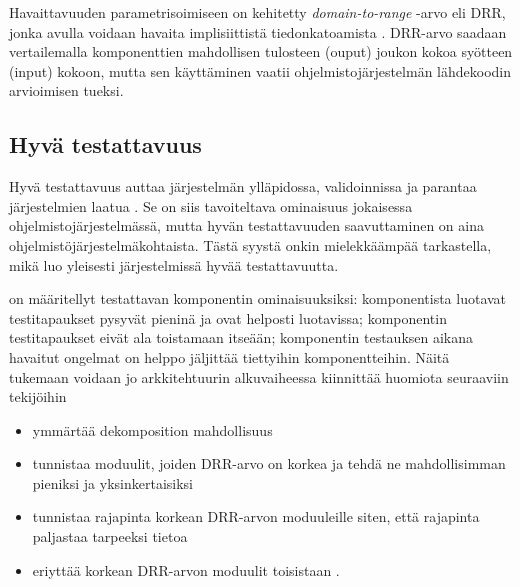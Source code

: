 \documentclass[finnish]{tktltiki2}
\theoremstyle{definition}
\theoremstyle{remark}
\begin{document}
Havaittavuuden parametrisoimiseen on kehitetty \textit{domain-to-range} -arvo eli DRR, jonka avulla voidaan havaita implisiittistä tiedonkatoamista \citep{Voas:1995:STN:624607.625469}. DRR-arvo saadaan vertailemalla komponenttien mahdollisen tulosteen (ouput) joukon kokoa syötteen (input) kokoon, mutta sen käyttäminen vaatii ohjelmistojärjestelmän lähdekoodin arvioimisen tueksi.



\subsection{Hyvä testattavuus}


Hyvä testattavuus auttaa järjestelmän ylläpidossa, validoinnissa ja parantaa järjestelmien laatua \citep[s. 20]{Voas:1995:STN:624607.625469}. Se on siis tavoiteltava ominaisuus jokaisessa ohjelmistojärjestelmässä, mutta hyvän testattavuuden saavuttaminen on aina ohjelmistöjärjestelmäkohtaista. Tästä syystä onkin mielekkäämpää tarkastella, mikä luo yleisesti järjestelmissä hyvää testattavuutta. 





\citep{Freedman:1991:TSC:126218.126229} on määritellyt testattavan komponentin ominaisuuksiksi: komponentista luotavat testitapaukset pysyvät pieninä ja ovat helposti luotavissa; komponentin testitapaukset eivät ala toistamaan itseään; komponentin testauksen aikana havaitut ongelmat on helppo jäljittää tiettyihin komponentteihin. Näitä tukemaan voidaan jo arkkitehtuurin alkuvaiheessa kiinnittää huomiota seuraaviin tekijöihin \citep{voas_improving_1992} 

\begin{itemize}
	\item ymmärtää dekomposition mahdollisuus
	\item tunnistaa moduulit, joiden DRR-arvo on korkea ja tehdä ne mahdollisimman pieniksi ja yksinkertaisiksi
	\item tunnistaa rajapinta korkean DRR-arvon moduuleille siten, että rajapinta paljastaa tarpeeksi tietoa
	\item eriyttää korkean DRR-arvon moduulit toisistaan \citep[s. 23]{Voas:1995:STN:624607.625469}.
\end{itemize}
\end{document}
